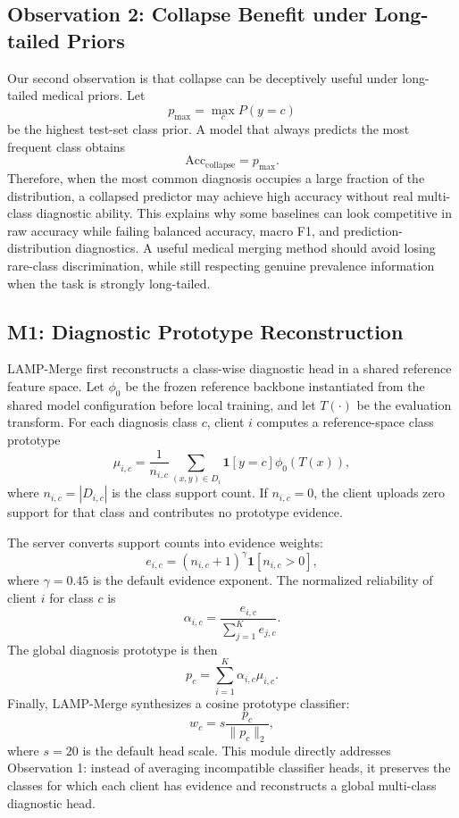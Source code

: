 \subsection{Observation 2: Collapse Benefit under Long-tailed Priors}

Our second observation is that collapse can be deceptively useful under long-tailed medical priors. Let
\[
p_{\max}=\max_c P(y=c)
\]
be the highest test-set class prior. A model that always predicts the most frequent class obtains
\[
\mathrm{Acc}_{\mathrm{collapse}}=p_{\max}.
\]
Therefore, when the most common diagnosis occupies a large fraction of the distribution, a collapsed predictor may achieve high accuracy without real multi-class diagnostic ability. This explains why some baselines can look competitive in raw accuracy while failing balanced accuracy, macro F1, and prediction-distribution diagnostics. A useful medical merging method should avoid losing rare-class discrimination, while still respecting genuine prevalence information when the task is strongly long-tailed.

\subsection{M1: Diagnostic Prototype Reconstruction}

LAMP-Merge first reconstructs a class-wise diagnostic head in a shared reference feature space. Let $\phi_0$ be the frozen reference backbone instantiated from the shared model configuration before local training, and let $T(\cdot)$ be the evaluation transform. For each diagnosis class $c$, client $i$ computes a reference-space class prototype
\[
\mu_{i,c}=\frac{1}{n_{i,c}}\sum_{(x,y)\in D_i}\mathbf{1}[y=c]\phi_0(T(x)),
\]
where $n_{i,c}=|D_{i,c}|$ is the class support count. If $n_{i,c}=0$, the client uploads zero support for that class and contributes no prototype evidence.

The server converts support counts into evidence weights:
\[
e_{i,c}=(n_{i,c}+1)^\gamma \mathbf{1}[n_{i,c}>0],
\]
where $\gamma=0.45$ is the default evidence exponent. The normalized reliability of client $i$ for class $c$ is
\[
\alpha_{i,c}=\frac{e_{i,c}}{\sum_{j=1}^{K} e_{j,c}}.
\]
The global diagnosis prototype is then
\[
p_c=\sum_{i=1}^{K}\alpha_{i,c}\mu_{i,c}.
\]
Finally, LAMP-Merge synthesizes a cosine prototype classifier:
\[
w_c=s\frac{p_c}{\|p_c\|_2},
\]
where $s=20$ is the default head scale. This module directly addresses Observation 1: instead of averaging incompatible classifier heads, it preserves the classes for which each client has evidence and reconstructs a global multi-class diagnostic head.

